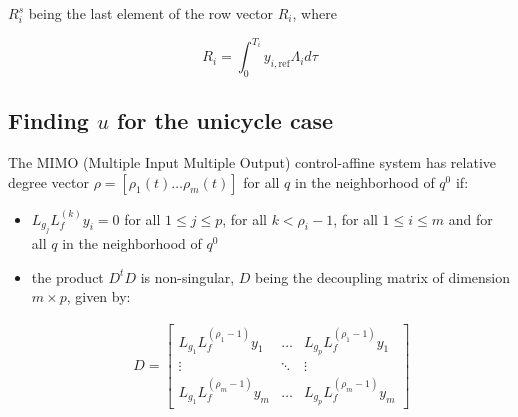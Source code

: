 \documentclass[letterpaper, 10 pt, conference]{ieeeconf}  %
\begin{document}
${R^s_i}$ being the last element of the row vector $R_i$, where

\begin{equation}
R_i = \int^{T_i}_0y_{i,\text{ref}}\Lambda_id\tau
\label{eq:obstofref}
\end{equation}



\subsection{Finding $u$ for the unicycle case}

The MIMO (Multiple Input Multiple Output) control-affine system has relative degree vector $\rho = [\rho_1(t) \dots \rho_m(t)]$ for all $q$ in the neighborhood of $q^0$ if:

\begin{itemize}
\item $L_{g_j}L_f^{(k)}y_i = 0$ for all $1 \leq j \leq p$, for all $k < \rho_i-1$, for all $1 \leq i \leq m$ and for all $q$ in the neighborhood of $q^0$
\item the product $D^tD$ is non-singular, $D$ being the decoupling matrix of dimension $m \times p$, given by:

\begin{eqnarray}
D = 
\left[\begin{array}{ccc}
L_{g_1}L_f^{(\rho_1-1)}y_1 & \dots & L_{g_p}L_f^{(\rho_1-1)}y_1\\
\vdots & \ddots & \vdots\\
L_{g_1}L_f^{(\rho_m-1)}y_m & \dots & L_{g_p}L_f^{(\rho_m-1)}y_m
\end{array}\right]
\end{eqnarray}

\end{itemize}
\end{document}
